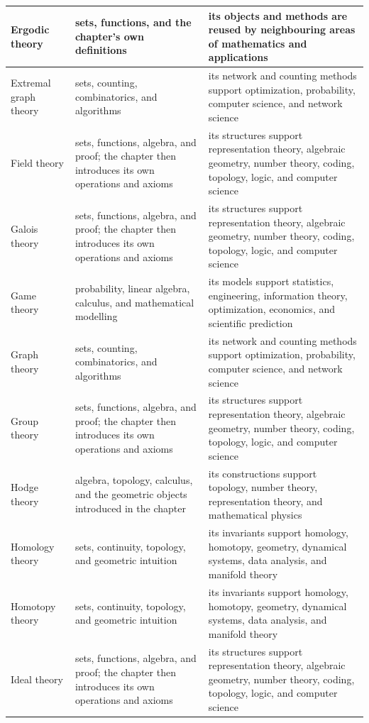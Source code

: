 \documentclass[11pt,oneside]{book}
\begin{document}
\begin{longtable}{>{\raggedright\arraybackslash}p{}>{\raggedright\arraybackslash}p{}>{\raggedright\arraybackslash}p{}}
\hline
Ergodic theory & sets, functions, and the chapter's own definitions & its objects and methods are reused by neighbouring areas of mathematics and applications\\
\hline
Extremal graph theory & sets, counting, combinatorics, and algorithms & its network and counting methods support optimization, probability, computer science, and network science\\
\hline
Field theory & sets, functions, algebra, and proof; the chapter then introduces its own operations and axioms & its structures support representation theory, algebraic geometry, number theory, coding, topology, logic, and computer science\\
\hline
Galois theory & sets, functions, algebra, and proof; the chapter then introduces its own operations and axioms & its structures support representation theory, algebraic geometry, number theory, coding, topology, logic, and computer science\\
\hline
Game theory & probability, linear algebra, calculus, and mathematical modelling & its models support statistics, engineering, information theory, optimization, economics, and scientific prediction\\
\hline
Graph theory & sets, counting, combinatorics, and algorithms & its network and counting methods support optimization, probability, computer science, and network science\\
\hline
Group theory & sets, functions, algebra, and proof; the chapter then introduces its own operations and axioms & its structures support representation theory, algebraic geometry, number theory, coding, topology, logic, and computer science\\
\hline
Hodge theory & algebra, topology, calculus, and the geometric objects introduced in the chapter & its constructions support topology, number theory, representation theory, and mathematical physics\\
\hline
Homology theory & sets, continuity, topology, and geometric intuition & its invariants support homology, homotopy, geometry, dynamical systems, data analysis, and manifold theory\\
\hline
Homotopy theory & sets, continuity, topology, and geometric intuition & its invariants support homology, homotopy, geometry, dynamical systems, data analysis, and manifold theory\\
\hline
Ideal theory & sets, functions, algebra, and proof; the chapter then introduces its own operations and axioms & its structures support representation theory, algebraic geometry, number theory, coding, topology, logic, and computer science\\

\end{longtable}
\end{document}
